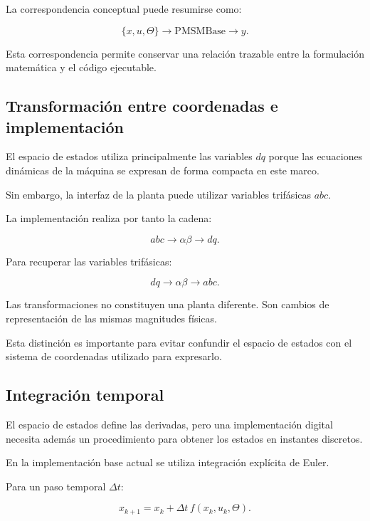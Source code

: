 La correspondencia conceptual puede resumirse como:

\begin{equation}
\{
x,u,\Theta
\}
\longrightarrow
\mathrm{PMSMBase}
\longrightarrow
y.
\end{equation}

Esta correspondencia permite conservar una relación trazable entre la formulación matemática y el código ejecutable.

\subsection{Transformación entre coordenadas e implementación}

El espacio de estados utiliza principalmente las variables $dq$ porque las ecuaciones dinámicas de la máquina se expresan de forma compacta en este marco.

Sin embargo, la interfaz de la planta puede utilizar variables trifásicas $abc$.

La implementación realiza por tanto la cadena:

\begin{equation}
abc
\rightarrow
\alpha\beta
\rightarrow
dq.
\end{equation}

Para recuperar las variables trifásicas:

\begin{equation}
dq
\rightarrow
\alpha\beta
\rightarrow
abc.
\end{equation}

Las transformaciones no constituyen una planta diferente. Son cambios de representación de las mismas magnitudes físicas.

Esta distinción es importante para evitar confundir el espacio de estados con el sistema de coordenadas utilizado para expresarlo.

\subsection{Integración temporal}

El espacio de estados define las derivadas, pero una implementación digital necesita además un procedimiento para obtener los estados en instantes discretos.

En la implementación base actual se utiliza integración explícita de Euler.

Para un paso temporal $\Delta t$:

\begin{equation}
x_{k+1}
=
x_k+\Delta t\,f(x_k,u_k,\Theta).
\end{equation}

